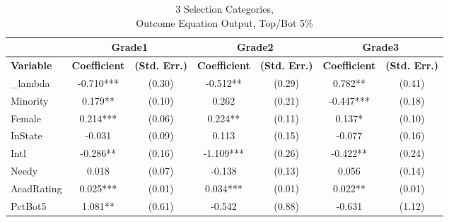 \begin{sidewaystable}[htb]\centering
  \begin{threeparttable}
    \caption{3 Selection Categories, \\Outcome Equation Output, Top/Bot 5\%}\label{table:b9}
    \begin{tabular}{l|c|c|c|c|c|c}
      \hline\hline 
                        & \multicolumn{2}{|c|}{Grade1} & \multicolumn{2}{|c|}{Grade2} & \multicolumn{2}{|c}{Grade3}                                                               \\
      \hline
      \textbf{Variable} & \textbf{Coefficient}         & \textbf{(Std. Err.)}         & \textbf{Coefficient} & \textbf{(Std. Err.)} & \textbf{Coefficient} & \textbf{(Std. Err.)} \\ 
      \hline
      \hline 
      \_lambda          & -0.710***                    & (0.30)                       & -0.512**             & (0.29)               & 0.782**              & (0.41)               \\
      Minority          & 0.179**                      & (0.10)                       & 0.262                & (0.21)               & -0.447***            & (0.18)               \\
      Female            & 0.214***                     & (0.06)                       & 0.224**              & (0.11)               & 0.137*               & (0.10)               \\
      InState           & -0.031                       & (0.09)                       & 0.113                & (0.15)               & -0.077               & (0.16)               \\
      Intl              & -0.286**                     & (0.16)                       & -1.109***            & (0.26)               & -0.422**             & (0.24)               \\
      Needy             & 0.018                        & (0.07)                       & -0.138               & (0.13)               & 0.056                & (0.14)               \\
      AcadRating        & 0.025***                     & (0.01)                       & 0.034***             & (0.01)               & 0.022**              & (0.01)               \\
      PctBot5           & 1.081**                      & (0.61)                       & -0.542               & (0.88)               & -0.631               & (1.12)               \\

\end{tabular}
\end{threeparttable}
\end{sidewaystable}
